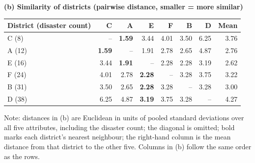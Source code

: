 \begin{table}[htbp]
  \par\vspace{1.1em}
  \textbf{(b) Similarity of districts (pairwise distance, smaller = more similar)}\\[0.4em]
  \begin{tabular}{@{}l r r r r r r r@{}}
    \toprule
    District (disaster count) & C & A & E & F & B & D & {Mean} \\
    \midrule
    C (8)  & --              & \textbf{1.59} & 3.44 & 4.01 & 3.50 & 6.25 & 3.76 \\
    A (12) & \textbf{1.59}   & --            & 1.91 & 2.78 & 2.65 & 4.87 & 2.76 \\
    E (16) & 3.44            & \textbf{1.91} & --   & 2.28 & 2.28 & 3.19 & 2.62 \\
    F (24) & 4.01            & 2.78          & \textbf{2.28} & -- & 3.28 & 3.75 & 3.22 \\
    B (31) & 3.50            & 2.65          & \textbf{2.28} & 3.28 & -- & 3.28 & 3.00 \\
    D (38) & 6.25            & 4.87          & \textbf{3.19} & 3.75 & 3.28 & -- & 4.27 \\
    \bottomrule
  \end{tabular}

  \par\vspace{0.5em}
  {\footnotesize
  Note: distances in (b) are Euclidean in units of pooled standard deviations over
  all five attributes, including the disaster count; the diagonal is omitted; bold
  marks each district's nearest neighbour; the right-hand column is the mean
  distance from that district to the other five. Columns in (b) follow the same
  order as the rows.}
\end{table}
